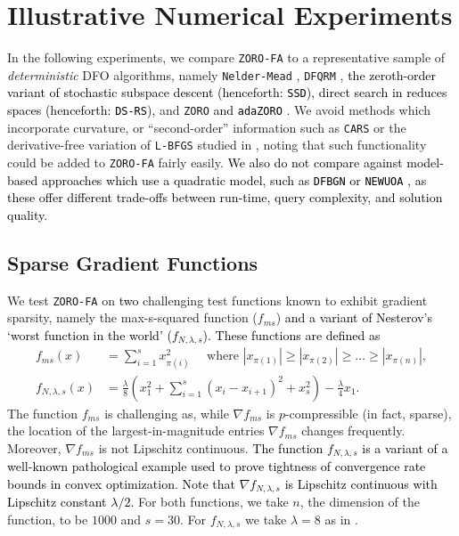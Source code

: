 \section{Illustrative Numerical Experiments}
In the following experiments, we compare {\tt ZORO-FA} to a representative sample of {\em deterministic} DFO algorithms, namely {\tt Nelder-Mead} \cite{NM}, {\tt DFQRM} \cite{grapiglia2024quadratic}, \textcolor{black}{the zeroth-order variant \cite{kozak2023} of stochastic subspace descent \cite{Kozak} (henceforth: {\tt SSD}), direct search in reduces spaces \cite{Roberts} (henceforth: {\tt DS-RS}),} and {\tt ZORO} \textcolor{black}{and {\tt adaZORO}} \cite{cai2022zeroth}. We avoid methods which incorporate curvature, or ``second-order'' information such as {\tt CARS} \cite{kim2021curvature} or the derivative-free variation of {\tt L-BFGS} studied in \cite{shi2023numerical}, noting that such functionality could be added to {\tt ZORO-FA} fairly easily. \textcolor{black}{We also do not compare against model-based approaches which use a quadratic model, such as {\tt DFBGN} \cite{Cartis} or  {\tt NEWUOA} \cite{powell2006newuoa,Zhang_2023}, as these offer different trade-offs between run-time, query complexity, and solution quality.}
 


\subsection{Sparse Gradient Functions}
\label{sec:Sparse_Benchmarking}
We test {\tt ZORO-FA} on \textcolor{black}{two} challenging test functions known to exhibit gradient sparsity, namely the max-s-squared function ($f_{ms}$) \cite{cai2022one,slavin2022adapting} \textcolor{black}{and a variant of Nesterov's `worst function in the world' \cite{Kozak,nesterov2013} ($f_{N,\lambda,s}$). These functions are defined as}
\begin{align*}
    f_{ms}(x) &= \sum_{i=1}^s x_{\pi(i)}^2 \quad \text{ where } |x_{\pi(1)}| \geq |x_{\pi(2)}| \geq \ldots \geq |x_{\pi(n)}|, \\
    f_{N,\lambda,s}(x) &= \frac{\lambda}{8}\left(x_1^2 + \sum_{i=1}^s\left(x_{i} - x_{i+1}\right)^2 + x_s^2  \right) - \frac{\lambda}{4}x_1.
\end{align*}
The function $f_{ms}$ is challenging as, while $\nabla f_{ms}$ is $p$-compressible (in fact, sparse), the location of the largest-in-magnitude entries $\nabla f_{ms}$ changes frequently. Moreover, $\nabla f_{ms}$ is not Lipschitz continuous. \textcolor{black}{The function $f_{N,\lambda,s}$ is a variant of a well-known pathological example used to prove tightness of convergence rate bounds in convex optimization. Note that $\nabla f_{N,\lambda,s}$ is Lipschitz continuous with Lipschitz constant $\lambda/2$.} For both functions, we take $n$, the dimension of the function, to be $1000$ and $s=30$. For $f_{N,\lambda,s}$ we take $\lambda = 8$ as in \cite{Kozak}.

